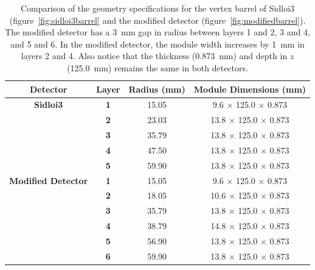\begin{table}
\begin{center}
\begin{small}
	\begin{tabular}{cc||cc}
		\textbf{Detector} & \textbf{Layer} & \textbf{Radius} (mm) & \textbf{Module Dimensions} (mm) \\
		\hline \hline
		\textbf{Sidloi3} & \textbf{1} & 15.05 & 9.6 $\times$ 125.0 $\times$ 0.873 \\
		 & \textbf{2} & 23.03 & 13.8 $\times$ 125.0 $\times$ 0.873 \\
		 & \textbf{3} & 35.79 & 13.8 $\times$ 125.0 $\times$ 0.873 \\
		 & \textbf{4} & 47.50 & 13.8 $\times$ 125.0 $\times$ 0.873 \\
		 & \textbf{5} & 59.90 & 13.8 $\times$ 125.0 $\times$ 0.873 \\
		\hline
		\textbf{Modified Detector} & \textbf{1} & 15.05 & 9.6 $\times$ 125.0 $\times$ 0.873 \\
		 & \textbf{2} & 18.05 & 10.6 $\times$ 125.0 $\times$ 0.873 \\
		 & \textbf{3} & 35.79 & 13.8 $\times$ 125.0 $\times$ 0.873 \\
		 & \textbf{4} & 38.79 & 14.8 $\times$ 125.0 $\times$ 0.873 \\
		 & \textbf{5} & 56.90 & 13.8 $\times$ 125.0 $\times$ 0.873 \\
		 & \textbf{6} & 59.90 & 13.8 $\times$ 125.0 $\times$ 0.873 \\
	\end{tabular}
\caption{Comparison of the geometry specifications for the vertex barrel of Sidloi3 (figure~\ref{fig:sidloi3barrel} and the modified detector (figure~\ref{fig:modifiedbarrel}). The modified detector has a 3~mm gap in radius between layers 1 and 2, 3 and 4, and 5 and 6. In the modified detector, the module width increases by  1~mm in layers 2 and 4. Also notice that the thickness (0.873~mm) and depth in $z$ (125.0~mm) remains the same in both detectors.}
\label{tab:vertexGeom}
\end{small}
\end{center}
\end{table}


